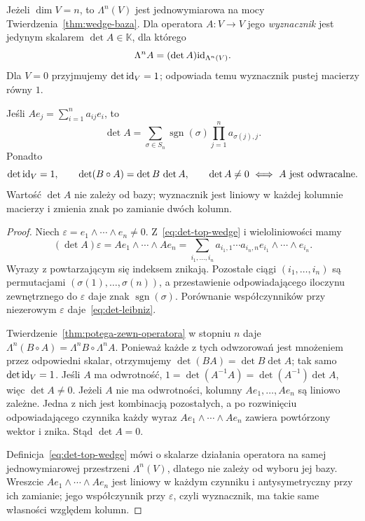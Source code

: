 \begin{definicja}
\label{def:det-wedge}
Jeżeli $\dim V=n$, to $\Lambda^n(V)$ jest jednowymiarowa
na mocy Twierdzenia~\ref{thm:wedge-baza}. Dla operatora
$A\colon V\to V$ jego \emph{wyznacznik} jest jedynym skalarem
$\det A\in\mathbb K$, dla którego
\begin{equation}\label{eq:det-top-wedge}
 \Lambda^n A=(\det A)\mathrm{id}_{\Lambda^n(V)}.
\end{equation}
Dla $V=0$ przyjmujemy $\det\mathrm{id}_V=1$; odpowiada temu
wyznacznik pustej macierzy równy $1$.
\end{definicja}

\begin{twierdzenie}
\label{thm:det-wlasnosci}
Jeśli $Ae_j=\sum_{i=1}^n a_{ij}e_i$, to
\begin{equation}\label{eq:det-leibniz}
 \det A=\sum_{\sigma\in S_n}\operatorname{sgn}(\sigma)
 \prod_{j=1}^n a_{\sigma(j),j}.
\end{equation}
Ponadto
\[
 \det\mathrm{id}_V=1,\qquad \det(B\circ A)=\det B\,\det A,
 \qquad \det A\ne0\ \Longleftrightarrow\ A\text{ jest odwracalne}.
\]
Wartość $\det A$ nie zależy od bazy; wyznacznik jest
liniowy w każdej kolumnie macierzy i zmienia znak po
zamianie dwóch kolumn.
\end{twierdzenie}
\begin{proof}
Niech $\varepsilon=e_1\wedge\cdots\wedge e_n\ne0$.
Z~\eqref{eq:det-top-wedge} i wieloliniowości mamy
\[
 (\det A)\varepsilon
 =Ae_1\wedge\cdots\wedge Ae_n
 =\sum_{i_1,\ldots,i_n}
   a_{i_1,1}\cdots a_{i_n,n}
   e_{i_1}\wedge\cdots\wedge e_{i_n}.
\]
Wyrazy z powtarzającym się indeksem znikają. Pozostałe
ciągi $(i_1,\ldots,i_n)$ są permutacjami
$(\sigma(1),\ldots,\sigma(n))$, a przestawienie odpowiadającego
iloczynu zewnętrznego do $\varepsilon$ daje znak
$\operatorname{sgn}(\sigma)$. Porównanie współczynników
przy niezerowym $\varepsilon$ daje~\eqref{eq:det-leibniz}.

Twierdzenie~\ref{thm:potega-zewn-operatora} w stopniu $n$
daje $\Lambda^n(B\circ A)=\Lambda^n B\circ\Lambda^n A$.
Ponieważ każde z tych odwzorowań jest mnożeniem przez odpowiedni
skalar, otrzymujemy $\det(BA)=\det B\det A$;
tak samo $\det\mathrm{id}_V=1$. Jeśli $A$ ma odwrotność,
$1=\det(A^{-1}A)=\det(A^{-1})\det A$, więc $\det A\ne0$.
Jeżeli $A$ nie ma odwrotności, kolumny $Ae_1,\ldots,Ae_n$
są liniowo zależne. Jedna z nich jest kombinacją pozostałych,
a po rozwinięciu odpowiadającego czynnika każdy wyraz
$Ae_1\wedge\cdots\wedge Ae_n$ zawiera powtórzony wektor
i znika. Stąd $\det A=0$.

Definicja~\eqref{eq:det-top-wedge} mówi o skalarze działania
operatora na samej jednowymiarowej przestrzeni
$\Lambda^n(V)$, dlatego nie zależy od wyboru jej bazy.
Wreszcie $Ae_1\wedge\cdots\wedge Ae_n$ jest liniowy
w każdym czynniku i antysymetryczny przy ich zamianie;
jego współczynnik przy $\varepsilon$, czyli wyznacznik,
ma takie same własności względem kolumn.
\end{proof}

